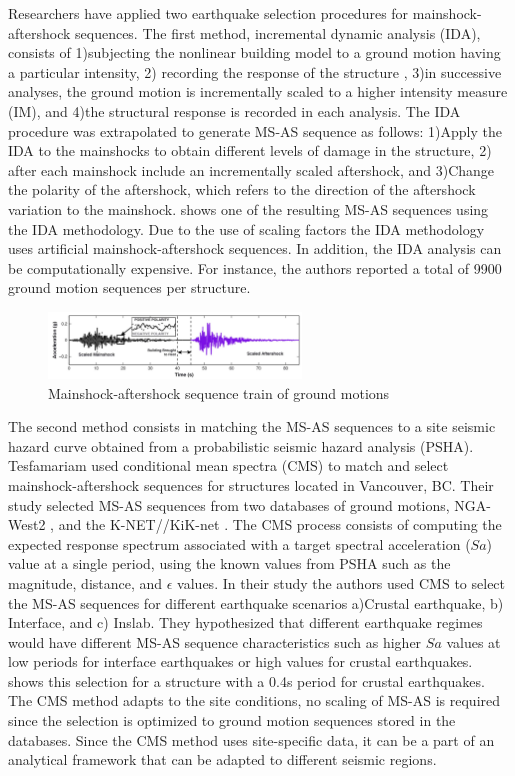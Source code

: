 Researchers have applied two earthquake selection procedures for mainshock-aftershock sequences. The first method, incremental dynamic analysis (IDA), consists of 1)subjecting the nonlinear building model to a ground motion having a particular intensity, 2) recording the response of the structure \cite{Vamvatsikos2002}, 3)in successive analyses, the ground motion is incrementally scaled to a higher intensity measure (IM), and 4)the structural response is recorded in each analysis. The IDA procedure was extrapolated to generate MS-AS sequence as follows: 1)Apply the IDA to the mainshocks to obtain different levels of damage in the structure, 2) after each mainshock include an incrementally scaled aftershock, and 3)Change the polarity of the aftershock, which refers to the direction of the aftershock variation to the mainshock.  shows one of the resulting MS-AS sequences using the IDA methodology. Due to the use of scaling factors the IDA methodology uses artificial mainshock-aftershock sequences. In addition, the IDA analysis can be computationally expensive. For instance, the authors reported a total of 9900 ground motion sequences per structure.

\begin{figure}[htbp]
\centering
\includegraphics[width=0.6\textwidth]{Chapter-2/figs/MS-AS_sequence_Luco}
\caption{Mainshock-aftershock sequence train of ground motions \cite{Raghunandan2015}}
\label{fig:MS-AS_Luco}
\end{figure}

The second method consists in matching the MS-AS sequences to a site seismic hazard curve obtained from a probabilistic seismic hazard analysis (PSHA). Tesfamariam \cite{Tesfamariam2015} used conditional mean spectra (CMS) to match and select mainshock-aftershock sequences for structures located in Vancouver, BC. Their study selected MS-AS sequences from two databases of ground motions, NGA-West2 \citep{Ancheta2014}, and the K-NET//KiK-net \cite{NIEDK-NETKiK-net2019}. The CMS process consists of computing the expected response spectrum associated with a target spectral acceleration ($Sa$) value at a single period, using the known values from PSHA such as the magnitude, distance, and $\epsilon$ values. In their study the authors used CMS to select the MS-AS sequences for different earthquake scenarios a)Crustal earthquake, b) Interface, and c) Inslab. They hypothesized that different earthquake regimes would have different MS-AS sequence characteristics such as higher $Sa$ values at low periods for interface earthquakes or high values for crustal earthquakes.  shows this selection for a structure with a 0.4s period for crustal earthquakes. The CMS method adapts to the site conditions, no scaling of MS-AS is required since the selection is optimized to ground motion sequences stored in the databases. Since the CMS method uses site-specific data, it can be a part of an analytical framework that can be adapted to different seismic regions.

